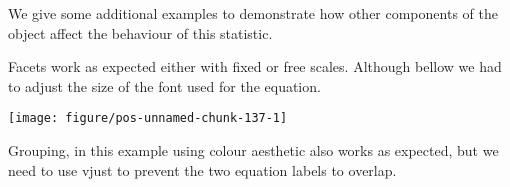 \documentclass[paper=a4,10pt,div=17,headsepline,BCOR=12mm,twoside,open=right]{scrbook}\usepackage{knitr}
\begin{document}
We give some additional examples to demonstrate how other components of the 
object affect the behaviour of this statistic.

Facets work as expected either with fixed or free scales. Although bellow we
had to adjust the size of the font used for the equation.



\begin{knitrout}\footnotesize
{}\color{fgcolor}\begin{kframe}
\begin{alltt}
 \hlkwb{<-}  \hlopt{~}  \hlstd{,}  \hlstd{=} \hlstd{)}
  \hlopt{+}
  \hlstd{()} \hlopt{+}
  \hlstd{(} \hlstd{=} \hlstd{,}   \hlopt{+}
  \hlstd{(}\hlstd{(}  
                  \hlstd{=} \hlstd{)} \hlopt{+}
  \hlstd{(}\hlopt{~}
\end{alltt}
\end{kframe}

{\centering \texttt{[image: figure/pos-unnamed-chunk-137-1]} 

}



\end{knitrout}

Grouping, in this example using colour aesthetic also works as expected, but we
need to use vjust to prevent the two equation labels to overlap.
\end{document}
